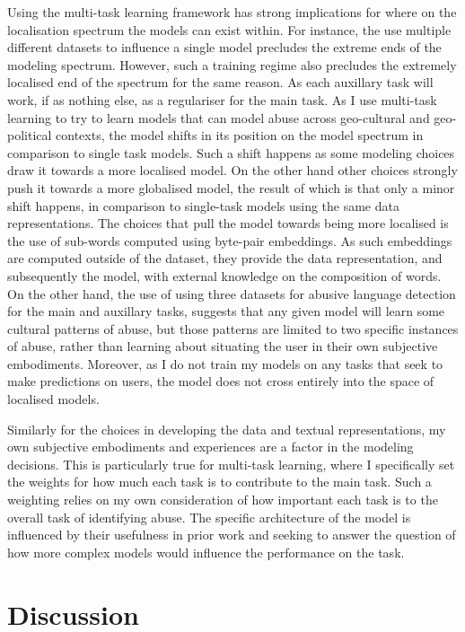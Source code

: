 {%
Using the multi-task learning framework has strong implications for where on the localisation spectrum the models can exist within. For instance, the use multiple different datasets to influence a single model precludes the extreme ends of the modeling spectrum. However, such a training regime also precludes the extremely localised end of the spectrum for the same reason. As each auxillary task will work, if as nothing else, as a regulariser for the main task.
As I use multi-task learning to try to learn models that can model abuse across geo-cultural and geo-political contexts, the model shifts in its position on the model spectrum in comparison to single task models. Such a shift happens as some modeling choices draw it towards a more localised model. On the other hand other choices strongly push it towards a more globalised model, the result of which is that only a minor shift happens, in comparison to single-task models using the same data representations. The choices that pull the model towards being more localised is the use of sub-words computed using byte-pair embeddings. As such embeddings are computed outside of the dataset, they provide the data representation, and subsequently the model, with external knowledge on the composition of words. On the other hand, the use of using three datasets for abusive language detection for the main and auxillary tasks, suggests that any given model will learn some cultural patterns of abuse, but those patterns are limited to two specific instances of abuse, rather than learning about situating the user in their own subjective embodiments. Moreover, as I do not train my models on any tasks that seek to make predictions on users, the model does not cross entirely into the space of localised models.

Similarly for the choices in developing the data and textual representations, my own subjective embodiments and experiences are a factor in the modeling decisions. This is particularly true for multi-task learning, where I specifically set the weights for how much each task is to contribute to the main task. Such a weighting relies on my own consideration of how important each task is to the overall task of identifying abuse. The specific architecture of the model is influenced by their usefulness in prior work \citep{Bingel:2018} and seeking to answer the question of how more complex models would influence the performance on the task.
}

\section{Discussion}

